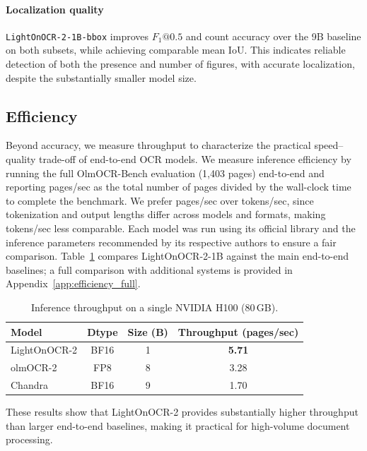 \documentclass{article}
\begin{document}
\paragraph{Localization quality}
\texttt{LightOnOCR-2-1B-bbox} improves $F_1@0.5$ and count accuracy over the 9B baseline on both subsets, while achieving comparable mean IoU. This indicates reliable detection of both the presence and number of figures, with accurate localization, despite the substantially smaller model size.


\subsection{Efficiency}
\label{sec:efficiency}
Beyond accuracy, we measure throughput to characterize the practical speed--quality trade-off of end-to-end OCR models. We measure inference efficiency by running the full OlmOCR-Bench evaluation (1,403 pages) end-to-end and reporting pages/sec as the total number of pages divided by the wall-clock time to complete the benchmark. We prefer pages/sec over tokens/sec, since tokenization and output lengths differ across models and formats, making tokens/sec less comparable.
Each model was run using its official library and the inference parameters recommended by its respective authors to ensure a fair comparison. Table~\ref{tab:efficiency_pages_per_sec} compares LightOnOCR-2-1B against the main end-to-end baselines; a full comparison with additional systems is provided in Appendix~\ref{app:efficiency_full}.

\begin{table}[htbp!]
\centering
\small
\setlength{\tabcolsep}{6pt}
\begin{tabular}{lccc}
\toprule
\textbf{Model} & \textbf{Dtype} & \textbf{Size (B)} & \textbf{Throughput (pages/sec)} \\
\midrule
LightOnOCR-2 & BF16 & 1 & \textbf{5.71} \\
olmOCR-2 & FP8 & 8 & 3.28 \\
Chandra & BF16 & 9 & 1.70 \\
\bottomrule
\end{tabular}
\caption{Inference throughput on a single NVIDIA H100 (80\,GB).}
\label{tab:efficiency_pages_per_sec}
\end{table}

These results show that LightOnOCR-2 provides substantially higher throughput than larger end-to-end baselines, making it practical for high-volume document processing.
\end{document}
